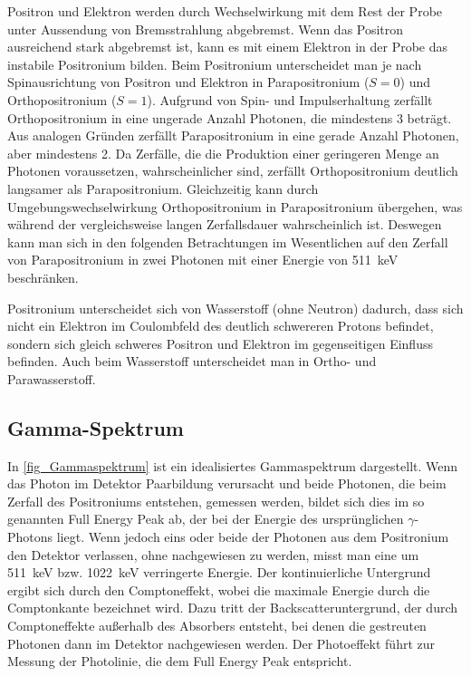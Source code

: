 \documentclass[
	a4paper,
	12pt,
	pagesize,
	ngerman
]{scrartcl}
\begin{document}
	Positron und Elektron werden durch Wechselwirkung mit dem Rest der Probe unter Aussendung von Bremsstrahlung abgebremst.
	Wenn das Positron ausreichend stark abgebremst ist, kann es mit einem Elektron in der Probe das instabile Positronium bilden.
	Beim Positronium unterscheidet man je nach Spinausrichtung von Positron und Elektron in Parapositronium ($S=0$) und Orthopositronium ($S=1$).
	Aufgrund von Spin- und Impulserhaltung zerfällt Orthopositronium in eine ungerade Anzahl Photonen, die mindestens \num{3} beträgt.
	Aus analogen Gründen zerfällt Parapositronium in eine gerade Anzahl Photonen, aber mindestens \num{2}.
	Da Zerfälle, die die Produktion einer geringeren Menge an Photonen voraussetzen, wahrscheinlicher sind, zerfällt Orthopositronium deutlich langsamer als Parapositronium.
	Gleichzeitig kann durch Umgebungswechselwirkung Orthopositronium in Parapositronium übergehen, was während der vergleichsweise langen Zerfallsdauer wahrscheinlich ist.
	Deswegen kann man sich in den folgenden Betrachtungen im Wesentlichen auf den Zerfall von Parapositronium in zwei Photonen mit einer Energie von \SI{511}{keV} beschränken.

	Positronium unterscheidet sich von Wasserstoff (ohne Neutron) dadurch, dass sich nicht ein Elektron im Coulombfeld des deutlich schwereren Protons befindet, sondern sich gleich schweres Positron und Elektron im gegenseitigen Einfluss befinden.
	Auch beim Wasserstoff unterscheidet man in Ortho- und Parawasserstoff.

	\subsection{Gamma-Spektrum}

		In \cref{fig_Gammaspektrum} ist ein idealisiertes Gammaspektrum dargestellt.
		Wenn das Photon im Detektor Paarbildung verursacht und beide Photonen, die beim Zerfall des Positroniums entstehen, gemessen werden, bildet sich dies im so genannten Full Energy Peak ab, der bei der Energie des ursprünglichen $\gamma$-Photons liegt.
		Wenn jedoch eins oder beide der Photonen aus dem Positronium den Detektor verlassen, ohne nachgewiesen zu werden, misst man eine um \SI{511}{keV} bzw. \SI{1022}{keV} verringerte Energie.
		Der kontinuierliche Untergrund ergibt sich durch den Comptoneffekt, wobei die maximale Energie durch die Comptonkante bezeichnet wird.
		Dazu tritt der Backscatteruntergrund, der durch Comptoneffekte außerhalb des Absorbers entsteht, bei denen die gestreuten Photonen dann im Detektor nachgewiesen werden.
		Der Photoeffekt führt zur Messung der Photolinie, die dem Full Energy Peak entspricht.
\end{document}
